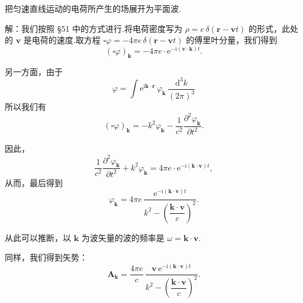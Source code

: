 \begin{xiti}

\quad 把匀速直线运动的电荷所产生的场展开为平面波.

解：我们按照 §51 中的方式进行.将电荷密度写为 $\rho=e\,\delta(\boldsymbol{r}-\boldsymbol{v}t)$ 的形式，此处的 $\boldsymbol{v}$ 是电荷的速度.取方程
$\square\varphi=-4\pi e\,\delta(\boldsymbol{r}-\boldsymbol{v}t)$ 的傅里叶分量，我们得到
\begin{equation*}
  (\square\varphi)_{\boldsymbol{k}}
  =-4\pi e\cdot\mathrm{e}^{-\mathrm{i}(\boldsymbol{v}\cdot\boldsymbol{k})t}.
\end{equation*}

另一方面，由于
\begin{equation*}
  \varphi=\int\mathrm{e}^{\mathrm{i}\boldsymbol{k}\cdot\boldsymbol{r}}\,
  \varphi_{\boldsymbol{k}}\,\frac{\mathrm{d}^3k}{(2\pi)^3}
\end{equation*}
所以我们有
\begin{equation*}
  (\square\varphi)_{\boldsymbol{k}}
  =-k^2\varphi_{\boldsymbol{k}}
  -\frac{1}{c^2}\frac{\partial^2\varphi_{\boldsymbol{k}}}{\partial t^2}.
\end{equation*}

因此，
\begin{equation*}
  \frac{1}{c^2}\frac{\partial^2\varphi_{\boldsymbol{k}}}{\partial t^2}
  +k^2\varphi_{\boldsymbol{k}}
  =4\pi e\cdot\mathrm{e}^{-\mathrm{i}(\boldsymbol{k}\cdot\boldsymbol{v})t},
\end{equation*}
从而，最后得到
\begin{equation*}
  \varphi_{\boldsymbol{k}}=4\pi e\,
  \frac{\mathrm{e}^{-\mathrm{i}(\boldsymbol{k}\cdot\boldsymbol{v})t}}
       {k^2-\left(\dfrac{\boldsymbol{k}\cdot\boldsymbol{v}}{c}\right)^2}.
\end{equation*}

从此可以推断，以 $\boldsymbol{k}$ 为波矢量的波的频率是 $\omega=\boldsymbol{k}\cdot\boldsymbol{v}$.

同样，我们得到矢势：
\begin{equation*}
  \boldsymbol{A}_{\boldsymbol{k}}=\frac{4\pi e}{c}\,
  \frac{\boldsymbol{v}\,\mathrm{e}^{-\mathrm{i}(\boldsymbol{k}\cdot\boldsymbol{v})t}}
       {k^2-\left(\dfrac{\boldsymbol{k}\cdot\boldsymbol{v}}{c}\right)^2}.
\end{equation*}


\end{xiti}
